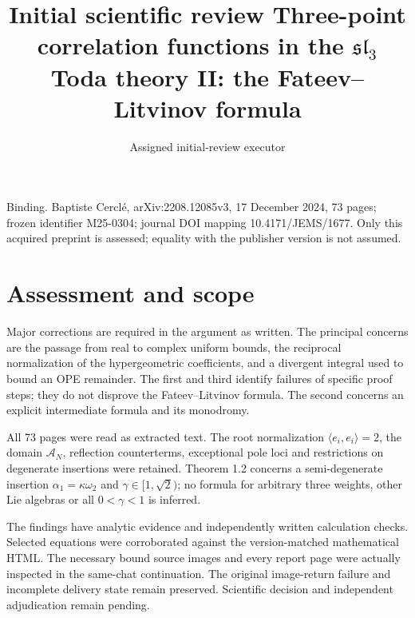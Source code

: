 \documentclass[10pt]{article}
\title{Initial scientific review
Three-point correlation functions in the \(\mathfrak{sl}_3\) Toda theory II: the Fateev–Litvinov formula}
\author{Assigned initial-review executor}
\date{}
\begin{document}
\maketitle
Binding. Baptiste Cerclé, arXiv:2208.12085v3, 17 December 2024, 73 pages; frozen identifier M25-0304; journal DOI mapping 10.4171/JEMS/1677. Only this acquired preprint is assessed; equality with the publisher version is not assumed.\par
\section*{Assessment and scope}
Major corrections are required in the argument as written. The principal concerns are the passage from real to complex uniform bounds, the reciprocal normalization of the hypergeometric coefficients, and a divergent integral used to bound an OPE remainder. The first and third identify failures of specific proof steps; they do not disprove the Fateev–Litvinov formula. The second concerns an explicit intermediate formula and its monodromy.\par
All 73 pages were read as extracted text. The root normalization \(\langle e_i,e_i\rangle=2\), the domain \(\mathcal A_N\), reflection counterterms, exceptional pole loci and restrictions on degenerate insertions were retained. Theorem 1.2 concerns a semi-degenerate insertion \(\alpha_1=\kappa\omega_2\) and \(\gamma\in[1,\sqrt2)\); no formula for arbitrary three weights, other Lie algebras or all \(0<\gamma<1\) is inferred.\par
The findings have analytic evidence and independently written calculation checks. Selected equations were corroborated against the version-matched mathematical HTML. The necessary bound source images and every report page were actually inspected in the same-chat continuation. The original image-return failure and incomplete delivery state remain preserved. Scientific decision and independent adjudication remain pending.\par
\end{document}
